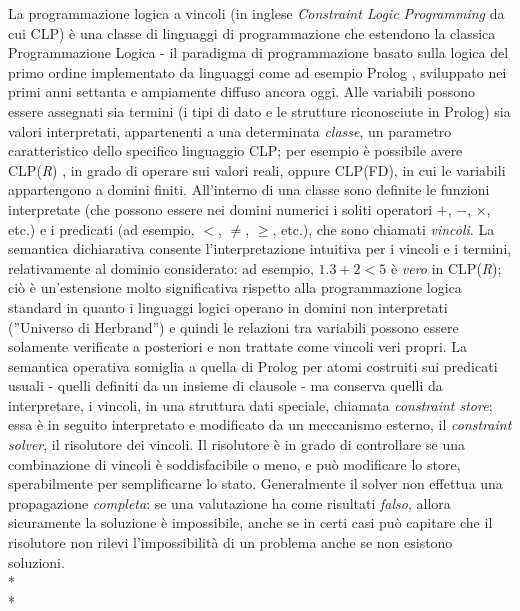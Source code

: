 \documentclass[12pt,a4paper,openright,twoside]{report}
\begin{document}
La programmazione logica a vincoli \cite{clpSurvey} (in inglese \emph{Constraint Logic Programming} da cui CLP) è una classe di linguaggi di programmazione che estendono la classica Programmazione Logica - il paradigma di programmazione basato sulla logica del primo ordine implementato da linguaggi come ad esempio Prolog \cite{Colmerauer,Kowalski,clocksin2003programming}, sviluppato nei primi anni settanta e ampiamente diffuso ancora oggi. Alle variabili possono essere assegnati sia termini (i tipi di dato e le strutture riconosciute in Prolog) sia valori interpretati, appartenenti a una determinata \emph{classe}, un parametro caratteristico dello specifico linguaggio CLP; per esempio è possibile avere CLP(\emph{R}) \cite{clpR}, in grado di operare sui valori reali, oppure CLP(FD), in cui le variabili appartengono a domini finiti. All'interno di una classe sono definite le funzioni interpretate (che possono essere nei domini numerici i soliti operatori $+$, $-$, $\times$, etc.) e i predicati (ad esempio, $<$, $\neq$, $\geq$, etc.), che sono chiamati \emph{vincoli}. La semantica dichiarativa consente l'interpretazione intuitiva per i vincoli e i termini, relativamente al dominio considerato: ad esempio, $1.3+2<5$ è \emph{vero} in CLP(\emph{R}); ciò è un'estensione molto significativa rispetto alla programmazione logica standard in quanto i linguaggi logici operano in domini non interpretati (''Universo di Herbrand'') e quindi le relazioni tra variabili possono essere solamente verificate a posteriori e non trattate come vincoli veri propri. La semantica operativa somiglia a quella di Prolog per atomi costruiti sui predicati usuali - quelli definiti da un insieme di clausole - ma conserva quelli da interpretare, i vincoli, in una struttura dati speciale, chiamata \emph{constraint store}; essa è in seguito interpretato e modificato da un meccanismo esterno, il \emph{constraint solver}, il risolutore dei vincoli. Il risolutore è in grado di controllare se una combinazione di vincoli è soddisfacibile o meno, e può modificare lo store, sperabilmente per semplificarne lo stato. Generalmente il solver non effettua una propagazione \emph{completa}: se una valutazione ha come risultati \emph{falso}, allora sicuramente la soluzione è impossibile, anche se in certi casi può capitare che il risolutore non rilevi l'impossibilità di un problema anche se non esistono soluzioni.\\*\\*  
\end{document}
